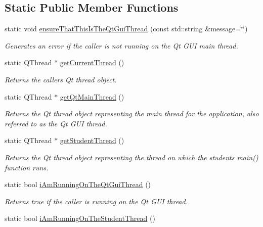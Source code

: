 \subsection*{Static Public Member Functions}
\begin{DoxyCompactItemize}
\item 
static void \mbox{\hyperlink{classGThread_a27a1f5f9657637e4a4b6a7127ca9da33}{ensure\+That\+This\+Is\+The\+Qt\+Gui\+Thread}} (const std\+::string \&message=\char`\"{}\char`\"{})
\begin{DoxyCompactList}\small\item\em Generates an error if the caller is not running on the Qt G\+UI main thread. \end{DoxyCompactList}\item 
static Q\+Thread $\ast$ \mbox{\hyperlink{classGThread_a7bf03645e8eb0dd26b54b4e48b5206e1}{get\+Current\+Thread}} ()
\begin{DoxyCompactList}\small\item\em Returns the caller\textquotesingle{}s Qt thread object. \end{DoxyCompactList}\item 
static Q\+Thread $\ast$ \mbox{\hyperlink{classGThread_ad1309b5071a8c56775d3c82a6d8ccd4d}{get\+Qt\+Main\+Thread}} ()
\begin{DoxyCompactList}\small\item\em Returns the Qt thread object representing the main thread for the application, also referred to as the Qt G\+UI thread. \end{DoxyCompactList}\item 
static Q\+Thread $\ast$ \mbox{\hyperlink{classGThread_ad230888eab766cd189ab09365776c41e}{get\+Student\+Thread}} ()
\begin{DoxyCompactList}\small\item\em Returns the Qt thread object representing the thread on which the student\textquotesingle{}s main() function runs. \end{DoxyCompactList}\item 
static bool \mbox{\hyperlink{classGThread_a410c93ed2a5eb78ea24013ef35e49eed}{i\+Am\+Running\+On\+The\+Qt\+Gui\+Thread}} ()
\begin{DoxyCompactList}\small\item\em Returns true if the caller is running on the Qt G\+UI thread. \end{DoxyCompactList}\item 
static bool \mbox{\hyperlink{classGThread_a3e60d512067e765b4e2d7c0c5bec39fa}{i\+Am\+Running\+On\+The\+Student\+Thread}} ()

\end{DoxyCompactItemize}
